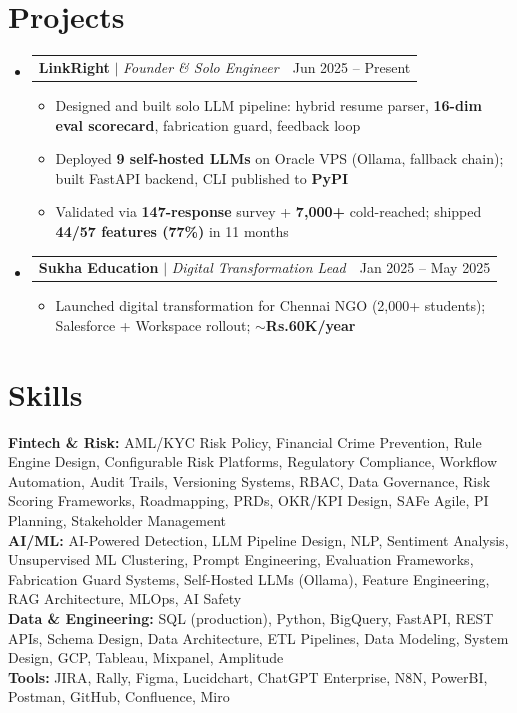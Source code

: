 \documentclass[a4paper,10pt]{article}
\makeatletter
\newcommand{\resumeItem}[1]{
  \item\small{#1\vspace{-2pt}}
}
\newcommand{\resumeProjectHeading}[2]{
  \item
  \begin{tabular*}{0.97\textwidth}{l@{\extracolsep{\fill}}r}
    \small#1 & #2 \\
  \end{tabular*}\vspace{-7pt}
}
\newcommand{\resumeSubHeadingListStart}{\begin{itemize}[leftmargin=0.15in, label={}]}
\newcommand{\resumeSubHeadingListEnd}{\end{itemize}}
\newcommand{\resumeItemListStart}{\begin{itemize}\parfillskip=0pt}
\newcommand{\resumeItemListEnd}{\end{itemize}\vspace{-5pt}}
\makeatother
\begin{document}
\section{Projects}
\resumeSubHeadingListStart

  \resumeProjectHeading
    {\textbf{LinkRight} $|$ \emph{Founder \& Solo Engineer}}{Jun 2025 -- Present}
  \resumeItemListStart
    \resumeItem{Designed and built solo LLM pipeline: hybrid resume parser, \textbf{16-dim eval scorecard}, fabrication guard, feedback loop}
    \resumeItem{Deployed \textbf{9 self-hosted LLMs} on Oracle VPS (Ollama, fallback chain); built FastAPI backend, CLI published to \textbf{PyPI}}
    \resumeItem{Validated via \textbf{147-response} survey + \textbf{7,000+} cold-reached; shipped \textbf{44/57 features (77\%)} in 11 months}
  \resumeItemListEnd

  \resumeProjectHeading
    {\textbf{Sukha Education} $|$ \emph{Digital Transformation Lead}}{Jan 2025 -- May 2025}
  \resumeItemListStart
    \resumeItem{Launched digital transformation for Chennai NGO (2,000+ students); Salesforce + Workspace rollout; \textbf{$\sim$Rs.60K/year}}
  \resumeItemListEnd

\resumeSubHeadingListEnd

\section{Skills}
\begin{itemize}[leftmargin=0.15in, label={}]
  \small{\item{
    \textbf{Fintech \& Risk:}{ AML/KYC Risk Policy, Financial Crime Prevention, Rule Engine Design, Configurable Risk Platforms, Regulatory Compliance, Workflow Automation, Audit Trails, Versioning Systems, RBAC, Data Governance, Risk Scoring Frameworks, Roadmapping, PRDs, OKR/KPI Design, SAFe Agile, PI Planning, Stakeholder Management} \\
    \textbf{AI/ML:}{ AI-Powered Detection, LLM Pipeline Design, NLP, Sentiment Analysis, Unsupervised ML Clustering, Prompt Engineering, Evaluation Frameworks, Fabrication Guard Systems, Self-Hosted LLMs (Ollama), Feature Engineering, RAG Architecture, MLOps, AI Safety} \\
    \textbf{Data \& Engineering:}{ SQL (production), Python, BigQuery, FastAPI, REST APIs, Schema Design, Data Architecture, ETL Pipelines, Data Modeling, System Design, GCP, Tableau, Mixpanel, Amplitude} \\
    \textbf{Tools:}{ JIRA, Rally, Figma, Lucidchart, ChatGPT Enterprise, N8N, PowerBI, Postman, GitHub, Confluence, Miro}
  }}
\end{itemize}
\end{document}
